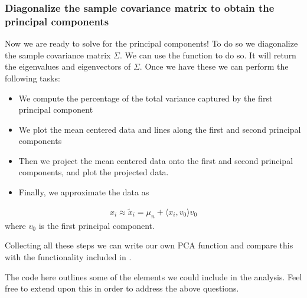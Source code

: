 \documentclass[letterpaper,10pt,english]{sphinxmanual}
\begin{document}
\subsubsection{Diagonalize the sample covariance matrix to obtain the principal components}
\label{\detokenize{chapter8:diagonalize-the-sample-covariance-matrix-to-obtain-the-principal-components}}
Now we are ready to solve for the principal components! To do so we
diagonalize the sample covariance matrix \(\Sigma\). We can use the
function  to do so. It will return the eigenvalues and
eigenvectors of \(\Sigma\). Once we have these we can perform the
following tasks:
\begin{itemize}
\item {} 
We compute the percentage of the total variance captured by the first principal component

\item {} 
We plot the mean centered data and lines along the first and second principal components

\item {} 
Then we project the mean centered data onto the first and second principal components, and plot the projected data.

\item {} 
Finally, we approximate the data as

\end{itemize}
\begin{equation*}
\begin{split}
x_i \approx \tilde{x}_i = \mu_n + \langle x_i, v_0 \rangle v_0
\end{split}
\end{equation*}
where \(v_0\) is the first principal component.

Collecting all these steps we can write our own PCA function and
compare this with the functionality included in .

The code here outlines some of the elements we could include in the
analysis. Feel free to extend upon this in order to address the above
questions.
\end{document}
